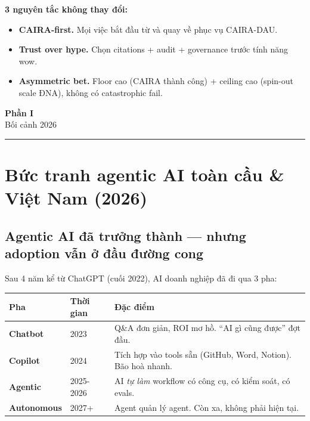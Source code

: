\documentclass[11pt,a4paper]{article}
\begin{document}
\textbf{3 nguyên tắc không thay đổi:}

\begin{itemize}
\item \textbf{CAIRA-first.} Mọi việc bắt đầu từ và quay về phục vụ CAIRA-DAU.
\item \textbf{Trust over hype.} Chọn citations + audit + governance trước tính năng wow.
\item \textbf{Asymmetric bet.} Floor cao (CAIRA thành công) + ceiling cao (spin-out scale ĐNA), không có catastrophic fail.
\end{itemize}

\clearpage

\begin{center}
\vspace*{0.5em}
{\sffamily\bfseries\Huge\color{ink} Phần I}\\[0.5em]
{\sffamily\LARGE\color{mid} Bối cảnh 2026}\\[0.5em]
{\color{ink}\rule{6cm}{0.4pt}}
\end{center}
\vspace{1em}

\section{Bức tranh agentic AI toàn cầu \& Việt Nam (2026)}

\subsection{Agentic AI đã trưởng thành --- nhưng adoption vẫn ở đầu đường cong}

Sau 4 năm kể từ ChatGPT (cuối 2022), AI doanh nghiệp đã đi qua 3 pha:

\begin{tabularx}{\linewidth}{@{}p{2.5cm} p{2.5cm} X@{}}
\toprule
\textbf{Pha} & \textbf{Thời gian} & \textbf{Đặc điểm} \\
\midrule
\textbf{Chatbot} & 2023 & Q\&A đơn giản, ROI mơ hồ. ``AI gì cũng được'' đợt đầu. \\
\textbf{Copilot} & 2024 & Tích hợp vào tools sẵn (GitHub, Word, Notion). Bão hoà nhanh. \\
\textbf{Agentic} & 2025-2026 & AI \emph{tự làm} workflow có công cụ, có kiểm soát, có evals. \\
\textbf{Autonomous} & 2027+ & Agent quản lý agent. Còn xa, không phải hiện tại. \\
\bottomrule
\end{tabularx}
\end{document}
